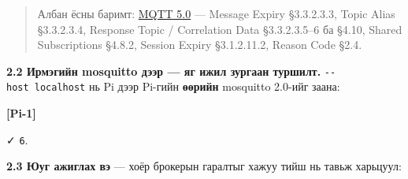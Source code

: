 \begin{quote}
Албан ёсны баримт: \href{https://docs.oasis-open.org/mqtt/mqtt/v5.0/mqtt-v5.0.html}{MQTT 5.0} --- Message Expiry §3.3.2.3.3, Topic Alias §3.3.2.3.4, Response Topic / Correlation Data §3.3.2.3.5--6 ба §4.10, Shared Subscriptions §4.8.2, Session Expiry §3.1.2.11.2, Reason Code §2.4.
\end{quote}

\textbf{2.2 Ирмэгийн mosquitto дээр --- яг ижил зургаан туршилт.} \texttt{-\/\allowbreak{}-host\ localhost} нь Pi дээр Pi-гийн \textbf{өөрийн} mosquitto 2.0-ийг заана:

\textbf{{[}Pi-1{]}}

\begin{Shaded}
\begin{Highlighting}[]
 \KeywordTok{|} 
 \KeywordTok{|} 
 \KeywordTok{|} 
 \KeywordTok{|} 
 \KeywordTok{|} 
 \KeywordTok{|} 
\KeywordTok{|} 
\end{Highlighting}
\end{Shaded}

✓ \texttt{6}.

\textbf{2.3 Юуг ажиглах вэ} --- хоёр брокерын гаралтыг хажуу тийш нь тавьж харьцуул:

